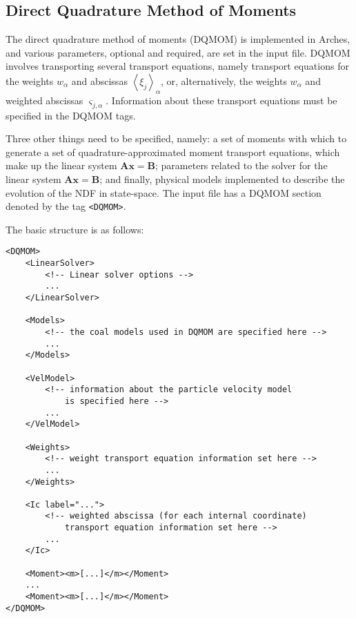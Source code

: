 







\subsection{Direct Quadrature Method of Moments}

The direct quadrature method of moments (DQMOM) is implemented in Arches, and various parameters, optional and required, are set in the input file. DQMOM involves transporting several transport equations, namely transport equations for the weights $w_{\alpha}$ and abscissas $ \left< \xi_{j} \right>_{\alpha}$, or, alternatively, the weights $w_{\alpha}$ and weighted abscissas $\varsigma_{j,\alpha}$.  Information about these transport equations must be specified in the DQMOM tags.

Three other things need to be specified, namely: a set of moments with which to generate a set of quadrature-approximated moment transport equations, which make up the linear system $\mathbf{Ax}=\mathbf{B}$; parameters related to the solver for the linear system $\mathbf{Ax} = \mathbf{B}$; and finally, physical models implemented to describe the evolution of the NDF in state-space. The input file has a DQMOM section denoted by the tag \verb=<DQMOM>=.

The basic structure is as follows:

\begin{Verbatim}[fontsize=\footnotesize]
<DQMOM>
	<LinearSolver>
		<!-- Linear solver options -->
		...
	</LinearSolver>
	
	<Models>
		<!-- the coal models used in DQMOM are specified here -->
		...
	</Models>
	
	<VelModel>
		<!-- information about the particle velocity model 
			is specified here -->
		...
	</VelModel>
	
	<Weights>
		<!-- weight transport equation information set here -->
		...
	</Weights>
	
	<Ic label="...">
		<!-- weighted abscissa (for each internal coordinate)
			transport equation information set here -->
		...
	</Ic>
	
	<Moment><m>[...]</m></Moment>
	...
	<Moment><m>[...]</m></Moment>
</DQMOM>
\end{Verbatim}


